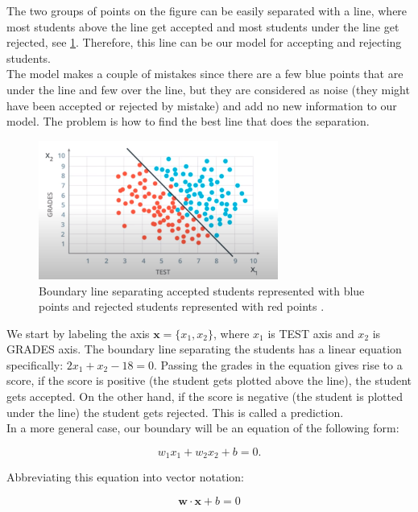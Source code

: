 The two groups of points on the figure can be easily separated with a line, where most students above the line get accepted and most students under the line get rejected, see \cref{fig:line}. Therefore, this line can be our model for accepting and rejecting students. \\
The model makes a couple of mistakes since there are a few blue points that are under the line and few over the line, but they are considered as noise (they might have been accepted or rejected by mistake) and add no new information to our model. The problem is how to find the best line that does the separation.

\begin{figure}[htbp]
  \centering
  \includegraphics[width=0.7\textwidth]{figs/fig2.png}
  \caption[Boundary line]{Boundary line separating accepted students represented with blue points and rejected students represented with red points \cite{ud188}.}\label{fig:line}
\end{figure}

We start by labeling the axis $\textbf{x} = \{x_{1}, x_{2}\}$, where $x_1$ is TEST axis and $x_2$ is GRADES axis. The boundary line separating the students has a linear equation specifically: $2x_{1} + x_{2} - 18 = 0$. Passing the grades in the equation gives rise to a score, if the score is positive (the student
gets plotted above the line), the student gets accepted. On the other hand, if the score is negative (the student is plotted under the line) the student gets rejected. This is called a prediction.\\
In a more general case, our boundary will be an equation of the following form:

$$w_{1}x_{1} + w_{2}x_{2} + b = 0.$$

Abbreviating this equation into vector notation:

\begin{equation}
  \label{linear}
  \textbf{w}\cdot\textbf{x} + b = 0
\end{equation}

